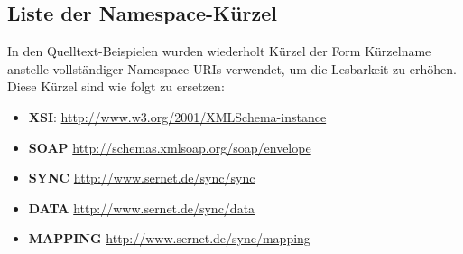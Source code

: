 \documentclass[a4paper,10pt]{book}
\begin{document}
\subsection{ Liste der Namespace-Kürzel}
In den Quelltext-Beispielen wurden wiederholt Kürzel der Form {Kürzelname} anstelle vollständiger Namespace-URIs verwendet, um die Lesbarkeit zu erhöhen. Diese Kürzel sind wie folgt zu ersetzen:
\begin{itemize}
 \item \textbf{XSI}: \href{http://www.w3.org/2001/XMLSchema-instance}{http://www.w3.org/2001/XMLSchema-instance}
 \item \textbf{SOAP} \href{http://schemas.xmlsoap.org/soap/envelope}{http://schemas.xmlsoap.org/soap/envelope}
 \item \textbf{SYNC} \href{http://www.sernet.de/sync/sync}{http://www.sernet.de/sync/sync}
 \item \textbf{DATA} \href{http://www.sernet.de/sync/data}{http://www.sernet.de/sync/data}
 \item \textbf{MAPPING} \href{http://www.sernet.de/sync/mapping}{http://www.sernet.de/sync/mapping}
\end{itemize}
\end{document}
